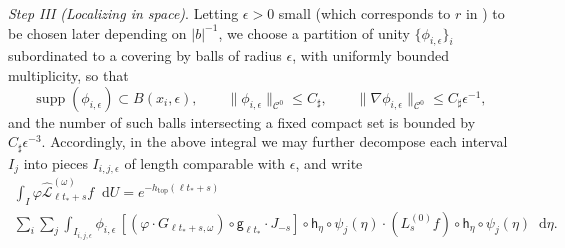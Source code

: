 \documentclass[11pt,letterpaper]{amsart}
\newcommand \cL {{\mathcal L}}
\newcommand{\horo}{\mathsf{h}}
\newcommand{\geo}{\mathsf{g}}
\newcommand*{\diff}{\mathop{}\!\mathrm{d}}
\newcommand{\eps}{\epsilon}
\DeclareMathOperator{\topp}{top}
\DeclareMathOperator{\supp}{supp}
\theoremstyle{definition}
\begin{document}



\textit{Step III (Localizing in space)}. Letting $\epsilon>0$ small  (which corresponds to $r$ in \cite{DeKiLi}) to be chosen later depending on $|b|^{-1}$, we choose a partition of unity $\{\phi_{i,\eps}\}_i$ subordinated to a covering by balls of radius $\eps$, with uniformly bounded multiplicity, so that
\[
\supp(\phi_{i,\eps}) \subset B(x_i,\eps),\qquad
\|\phi_{i,\eps}\|_{\mathscr C^0}\le C_\sharp,\qquad
\|\nabla \phi_{i,\eps}\|_{\mathscr C^0}\le C_\sharp \eps^{-1},
\]
and the number of such balls intersecting a fixed compact set is bounded by $C_\sharp \eps^{-3}$.
Accordingly, in the above integral we may further decompose each interval $I_j$ into pieces
$I_{i,j,\eps}$ of length comparable with $\eps$, and write
\begin{multline}\label{eq:integral3}
	\int_I \varphi \hat\cL^{(\omega)}_{\ell {t_*}+s}f \diff U =
	e^{-h_{\topp}(\ell {t_*}+s)} \\ \sum_{i} \sum_{j} \int_{I_{i,j,\eps}} \phi_{i,\eps} \, [(\varphi\cdot  G_{\ell {t_*}+s, \omega}) \circ \geo_{\ell t_*} \cdot J_{-s}]\circ \horo_{\eta} \circ \psi_j(\eta) \cdot (L^{(0)}_{s}f) \circ \horo_{\eta}\circ \psi_j(\eta) \diff \eta.
\end{multline}




\end{document}
